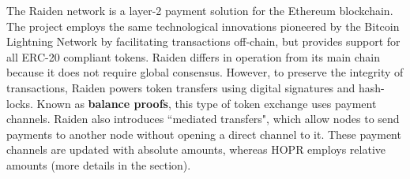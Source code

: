 The Raiden network \cite{raiden} is a layer-2 payment solution for the Ethereum blockchain. The project employs the same technological innovations pioneered by the Bitcoin Lightning Network by facilitating transactions off-chain, but provides support for all ERC-20 compliant tokens. Raiden differs in operation from its main chain because it does not require global consensus. However, to preserve the integrity of transactions, Raiden powers token transfers using digital signatures and hash-locks. Known as \textbf{balance proofs}, this type of token exchange uses payment channels. Raiden also introduces ``mediated transfers", which allow nodes to send payments to another node without opening a direct channel to it. These payment channels are updated with absolute amounts, whereas HOPR employs relative amounts (more details in the  section).

